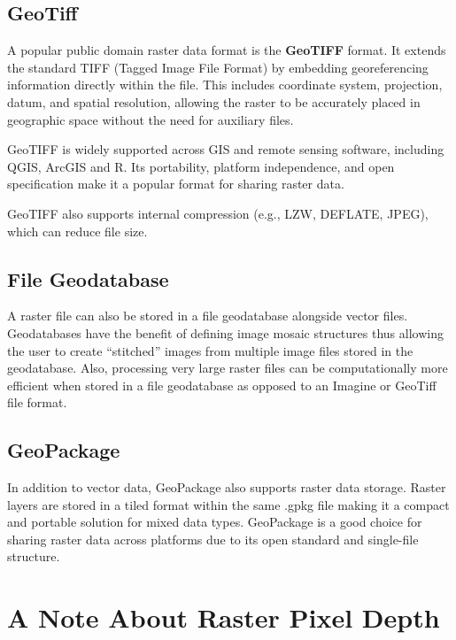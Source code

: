 \documentclass[
  letterpaper,
]{book}
\begin{document}
\subsection{GeoTiff}\label{geotiff}

A popular public domain raster data format is the \textbf{GeoTIFF}
format. It extends the standard TIFF (Tagged Image File Format) by
embedding georeferencing information directly within the file. This
includes coordinate system, projection, datum, and spatial resolution,
allowing the raster to be accurately placed in geographic space without
the need for auxiliary files.

GeoTIFF is widely supported across GIS and remote sensing software,
including QGIS, ArcGIS and R. Its portability, platform independence,
and open specification make it a popular format for sharing raster data.

GeoTIFF also supports internal compression (e.g., LZW, DEFLATE, JPEG),
which can reduce file size.

\subsection{File Geodatabase}\label{file-geodatabase-1}

A raster file can also be stored in a file geodatabase alongside vector
files. Geodatabases have the benefit of defining image mosaic structures
thus allowing the user to create ``stitched'' images from multiple image
files stored in the geodatabase. Also, processing very large raster
files can be computationally more efficient when stored in a file
geodatabase as opposed to an Imagine or GeoTiff file format.

\subsection{GeoPackage}\label{geopackage-1}

In addition to vector data, GeoPackage also supports raster data
storage. Raster layers are stored in a tiled format within the same
.gpkg file making it a compact and portable solution for mixed data
types. GeoPackage is a good choice for sharing raster data across
platforms due to its open standard and single-file structure.

\section{A Note About Raster Pixel
Depth}\label{a-note-about-raster-pixel-depth}
\end{document}

